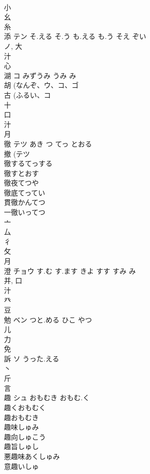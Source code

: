 \documentclass[8pt]{extreport}
\begin{document}
\begin{CJK}{UTF8}{min}
\\	小 
\\	幺 
\\	糸 
\\	添	テン	そ.える そ.う も.える も.う そえ ぞい	
\\	ノ, 大 
\\	汁 
\\	心 
\\	湖	コ	みずうみ うみ み	
\\	胡 (なんぞ、ウ、コ、ゴ 
\\	古 (ふるい、コ 
\\	十 
\\	口 
\\	汁 
\\	月 
\\	徹	テツ	あき つ てっ とおる	
\\	撤 (テツ 
\\	徹するてっする 
\\	徹すとおす 
\\	徹夜てつや 
\\	徹底てってい 
\\	貫徹かんてつ 
\\	一徹いってつ 
\\	亠 
\\	厶 
\\	彳 
\\	攵 
\\	月 
\\	澄	チョウ	す.む す.ます きよ すす すみ み	
\\	并, 口 
\\	汁 
\\	癶 
\\	豆 
\\	勉	ベン	つと.める ひこ やつ	
\\	儿 
\\	力 
\\	免 
\\	訴	ソ	うった.える	
\\	丶 
\\	斤 
\\	言 
\\	趣	シュ	おもむき おもむ.く	
\\	趣くおもむく
\\	趣おもむき
\\	趣味しゅみ
\\	趣向しゅこう
\\	趣旨しゅし
\\	悪趣味あくしゅみ
\\	意趣いしゅ

\end{CJK}
\end{document}
